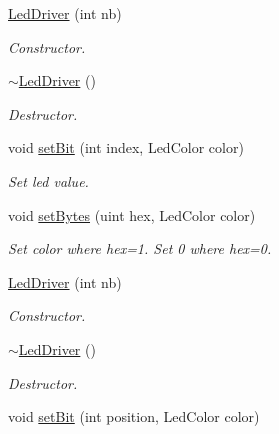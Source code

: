 \begin{DoxyCompactItemize}
\mbox{\label{classLedDriver_a23265705c54ed45e32b91ed9b2f4e0b6}} 
\hyperlink{classLedDriver_a23265705c54ed45e32b91ed9b2f4e0b6}{Led\+Driver} (int nb)
\begin{DoxyCompactList}\small\item\em Constructor. \end{DoxyCompactList}\item 
\mbox{\label{classLedDriver_a8b6afd79e2715068ff08c51a9df28065}} 
\hyperlink{classLedDriver_a8b6afd79e2715068ff08c51a9df28065}{$\sim$\+Led\+Driver} ()
\begin{DoxyCompactList}\small\item\em Destructor. \end{DoxyCompactList}\item 
void \hyperlink{classLedDriver_af5ec63943cb92b14a887fdd2a5491e93}{set\+Bit} (int index, Led\+Color color)
\begin{DoxyCompactList}\small\item\em Set led value. \end{DoxyCompactList}\item 
void \hyperlink{classLedDriver_a66512dd673a81681d3597e301af13759}{set\+Bytes} (uint hex, Led\+Color color)
\begin{DoxyCompactList}\small\item\em Set color where hex=1. Set 0 where hex=0. \end{DoxyCompactList}\item 
\mbox{\label{classLedDriver_a23265705c54ed45e32b91ed9b2f4e0b6}} 
\hyperlink{classLedDriver_a23265705c54ed45e32b91ed9b2f4e0b6}{Led\+Driver} (int nb)
\begin{DoxyCompactList}\small\item\em Constructor. \end{DoxyCompactList}\item 
\mbox{\label{classLedDriver_a8b6afd79e2715068ff08c51a9df28065}} 
\hyperlink{classLedDriver_a8b6afd79e2715068ff08c51a9df28065}{$\sim$\+Led\+Driver} ()
\begin{DoxyCompactList}\small\item\em Destructor. \end{DoxyCompactList}\item 
void \hyperlink{classLedDriver_a1856fb030d88bcacdc37dfce7f0f8136}{set\+Bit} (int position, Led\+Color color)

\end{DoxyCompactItemize}

